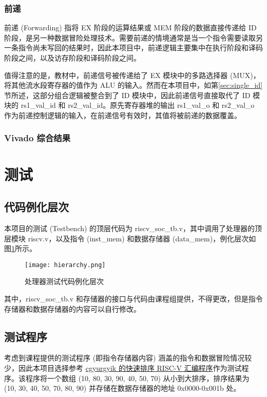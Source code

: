 \documentclass[lang=zh]{sjtuarticle}	%
\begin{document}
\subsubsection{前递}

前递 (Forwarding) 指将 EX 阶段的运算结果或 MEM 阶段的数据直接传递给 ID 阶段，是另一种数据冒险处理技术。需要前递的情境通常是当一个指令需要读取另一条指令尚未写回的结果时，因此本项目中，前递逻辑主要集中在执行阶段和译码阶段之间，以及访存阶段和译码阶段之间。

值得注意的是，教材\cite{COD}中，前递信号被传递给了 EX 模块中的多路选择器 (MUX)，将其他流水段寄存器的值作为 ALU 的输入。然而在本项目中，如第\ref{sec:single_id}节所述，这部分组合逻辑被整合到了 ID 模块中，因此前递信号直接取代了 ID 模块的 rs1\_val\_id 和 rs2\_val\_id。原先寄存器堆的输出 rs1\_val\_o 和 rs2\_val\_o 作为前递控制逻辑的输入，在前递信号有效时，其值将被前递的数据覆盖。

\subsubsection{Vivado 综合结果}

\section{测试}

\subsection{代码例化层次}

本项目的测试 (Testbench) 的顶层代码为 riscv\_soc\_tb.v，其中调用了处理器的顶层模块 riscv.v，以及指令 (inst\_mem) 和数据存储器 (data\_mem)，例化层次如图\ref{fig:hierarchy}所示。

\begin{figure}[!htp]
	\centering
	\texttt{[image: hierarchy.png]}
	\caption{处理器测试代码例化层次}
	\label{fig:hierarchy}
\end{figure}

其中，riscv\_soc\_tb.v 和存储器的接口与代码由课程组提供，不得更改，但是指令存储器和数据存储器的内容可以自行修改。

\subsection{测试程序}

考虑到课程提供的测试程序 (即指令存储器内容) 涵盖的指令和数据冒险情况较少，因此本项目选择参考 \href{https://github.com/cgyurgyik/riscv-assembly/blob/master/quicksort.s}{cgyurgyik 的快速排序 RISC-V 汇编程序}作为测试程序。该程序将一个数组 (10, 80, 30, 90, 40, 50, 70) 从小到大排序，排序结果为 (10, 30, 40, 50, 70, 80, 90) 并存储在数据存储器的地址 0x0000-0x001b 处。
\end{document}
